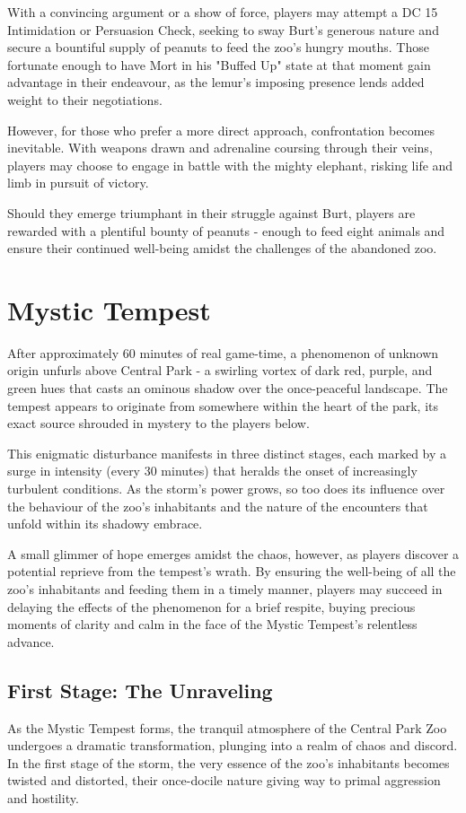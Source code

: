 With a convincing argument or a show of force, players may attempt a DC 15 Intimidation or Persuasion Check, seeking to sway Burt's generous nature and secure a bountiful supply of peanuts to feed the zoo's hungry mouths. Those fortunate enough to have Mort in his "Buffed Up" state at that moment gain advantage in their endeavour, as the lemur's imposing presence lends added weight to their negotiations.

However, for those who prefer a more direct approach, confrontation becomes inevitable. With weapons drawn and adrenaline coursing through their veins, players may choose to engage in battle with the mighty elephant, risking life and limb in pursuit of victory.

Should they emerge triumphant in their struggle against Burt, players are rewarded with a plentiful bounty of peanuts - enough to feed eight animals and ensure their continued well-being amidst the challenges of the abandoned zoo.

\section*{Mystic Tempest}
After approximately 60 minutes of real game-time, a phenomenon of unknown origin unfurls above Central Park - a swirling vortex of dark red, purple, and green hues that casts an ominous shadow over the once-peaceful landscape. The tempest appears to originate from somewhere within the heart of the park, its exact source shrouded in mystery to the players below.

This enigmatic disturbance manifests in three distinct stages, each marked by a surge in intensity (every 30 minutes) that heralds the onset of increasingly turbulent conditions. As the storm's power grows, so too does its influence over the behaviour of the zoo's inhabitants and the nature of the encounters that unfold within its shadowy embrace.

A small glimmer of hope emerges amidst the chaos, however, as players discover a potential reprieve from the tempest's wrath. By ensuring the well-being of all the zoo's inhabitants and feeding them in a timely manner, players may succeed in delaying the effects of the phenomenon for a brief respite, buying precious moments of clarity and calm in the face of the Mystic Tempest's relentless advance.
\subsection*{First Stage: The Unraveling}
As the Mystic Tempest forms, the tranquil atmosphere of the Central Park Zoo undergoes a dramatic transformation, plunging into a realm of chaos and discord. In the first stage of the storm, the very essence of the zoo's inhabitants becomes twisted and distorted, their once-docile nature giving way to primal aggression and hostility.

